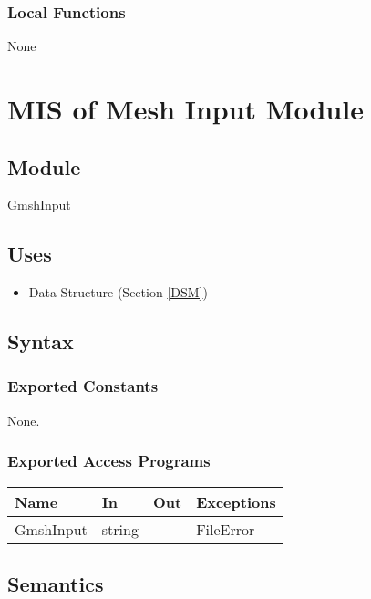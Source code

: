 \documentclass[12pt, titlepage]{article}
\begin{document}
	
	\subsubsection{Local Functions}
	
	None
	
	\newpage %
	
	\section{MIS of Mesh Input Module} \label{MIM}
	
	\subsection{Module} GmshInput
	
	\subsection{Uses} \begin{itemize} \item Data Structure (Section \ref{DSM})
		
	\end{itemize}
	
	\subsection{Syntax}
	
	\subsubsection{Exported Constants} None. \subsubsection{Exported Access
		Programs}
	
	\begin{center} \begin{tabular}{p{4cm} p{2cm} p{2cm} p{2cm}} \hline \textbf{Name}
			& \textbf{In} & \textbf{Out} & \textbf{Exceptions} \\ \hline GmshInput & string
			& - & FileError \\ \hline \end{tabular}
	\end{center}
	
	\subsection{Semantics}
	
\end{document}
